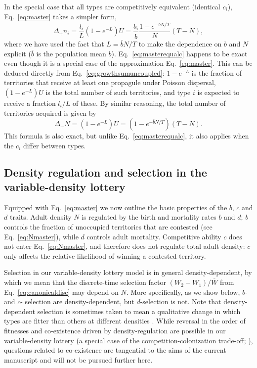 \documentclass[12pt]{article}
\begin{document}
In the special case that all types are competitively equivalent (identical $c_i$), Eq.~\eqref{eq:master} takes a simpler form,
\begin{equation}
\Delta_+ n_i = \frac{l_i}{L}(1-e^{-L})U=\frac{b_i}{\overline{b}}\frac{1-e^{-\overline{b}N/T}}{N}(T-N), \label{eq:masterequalc}
\end{equation}
where we have used the fact that $L=\overline{b}N/T$ to make the dependence on $b$ and $N$ explicit ($\overline{b}$ is the population mean $b$). Eq.~\eqref{eq:masterequalc} happens to be exact even though it is a special case of the approximation Eq.~\eqref{eq:master}. This can be deduced directly from Eq.~\eqref{eq:growthsumuncoupled}: $1-e^{-L}$ is the fraction of territories that receive at least one propagule under Poisson dispersal, $(1-e^{-L})U$ is the total number of such territories, and type $i$ is expected to receive a fraction $l_i/L$ of these. By similar reasoning, the total number of territories acquired is given by
\begin{equation}
\Delta_+ N=(1-e^{-L})U=(1-e^{-\overline{b}N/T})(T-N). \label{eq:Nmaster}
\end{equation}
This formula is also exact, but unlike Eq.~\eqref{eq:masterequalc}, it also applies when the $c_i$ differ between types. 

\subsection*{Density regulation and selection in the variable-density lottery}

Equipped with Eq.~\eqref{eq:master} we now outline the basic properties of the $b$, $c$ and $d$ traits. Adult density $N$ is regulated by the birth and mortality rates $b$ and $d$; $b$ controls the fraction of unoccupied territories that are contested (see Eq.~\eqref{eq:Nmaster}), while $d$ controls adult mortality. Competitive ability $c$ does not enter Eq.~\eqref{eq:Nmaster}, and therefore does not regulate total adult density: $c$ only affects the relative likelihood of winning a contested territory.

Selection in our variable-density lottery model is in general density-dependent, by which we mean that the discrete-time selection factor $(W_2-W_1)/\overline{W}$ from Eq.~\eqref{eq:canonicaldisc} may depend on $N$. More specifically, as we show below, $b$- and $c$- selection are density-dependent, but $d$-selection is not. Note that density-dependent selection is sometimes taken to mean a qualitative change in which types are fitter than others at different densities \citep{travis_2013}. While reversal in the order of fitnesses and co-existence driven by density-regulation are possible in our variable-density lottery (a special case of the competition-colonization trade-off; \citealt{levins_71,tilman_94,bolker_99}), questions related to co-existence are tangential to the aims of the current manuscript and will not be pursued further here.
\end{document}
